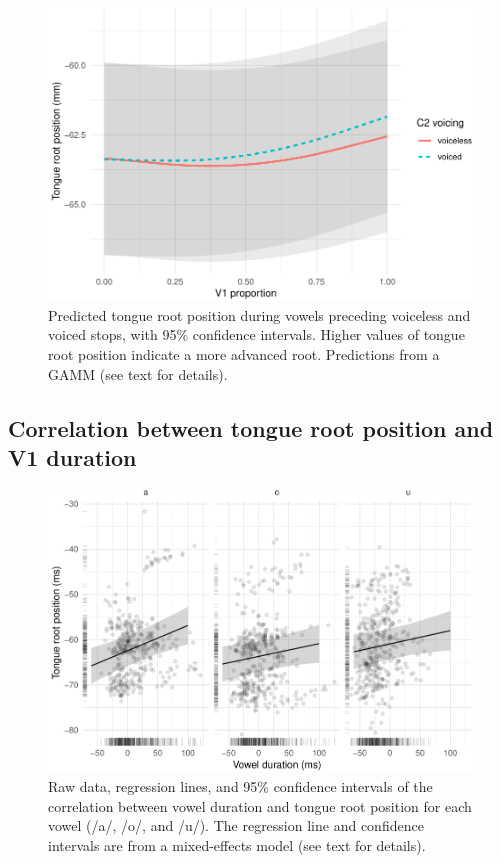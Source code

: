 \documentclass[12pt,]{article}
\begin{document}
\begin{figure}
\includegraphics[width=\linewidth]{2018-tra_files/figure-latex/tra-gam-plot-1} \caption{Predicted tongue root position during vowels preceding voiceless and voiced stops, with 95\% confidence intervals. Higher values of tongue root position indicate a more advanced root. Predictions from a GAMM (see text for details).}\label{f:tra-gam-plot}
\end{figure}

\hypertarget{correlation-between-tongue-root-position-and-v1-duration}{%
\subsection{Correlation between tongue root position and V1
duration}\label{correlation-between-tongue-root-position-and-v1-duration}}

\label{s:trp-vdur}

\begin{figure}
\includegraphics[width=\linewidth]{2018-tra_files/figure-latex/tra-lm-2-plot-1} \caption{Raw data, regression lines, and 95\% confidence intervals of the correlation between vowel duration and tongue root position for each vowel (/a/, /o/, and /u/). The regression line and confidence intervals are from a mixed-effects model (see text for details).}\label{f:tra-lm-2-plot}
\end{figure}
\end{document}
